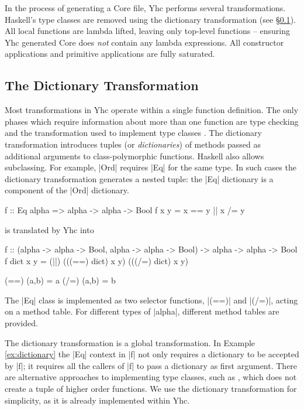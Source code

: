 In the process of generating a Core file, Yhc performs several transformations. Haskell's type classes are removed using the dictionary transformation (see \S\ref{sec:dictionary_transformation}). All local functions are lambda lifted, leaving only top-level functions -- ensuring Yhc generated Core does \textit{not} contain any lambda expressions. All constructor applications and primitive applications are fully saturated.


\subsection{The Dictionary Transformation}
\label{sec:dictionary_transformation}

Most transformations in Yhc operate within a single function definition. The only phases which require information about more than one function are type checking and the transformation used to implement type classes \citep{wadler:type_classes}. The dictionary transformation introduces tuples (or \textit{dictionaries}) of methods passed as additional arguments to class-polymorphic functions. Haskell also allows subclassing. For example, |Ord| requires |Eq| for the same type. In such cases the dictionary transformation generates a nested tuple: the |Eq| dictionary is a component of the |Ord| dictionary.

\begin{example}
\label{ex:dictionary}
\begin{code}
f :: Eq alpha => alpha -> alpha -> Bool
f x y = x == y || x /= y
\end{code}

\noindent is translated by Yhc into

\begin{code}
f :: (alpha -> alpha -> Bool, alpha -> alpha -> Bool) -> alpha -> alpha -> Bool
f dict x y = (||) (((==) dict) x y) (((/=) dict) x y)

(==) (a,b) = a
(/=) (a,b) = b
\end{code}

The |Eq| class is implemented as two selector functions, |(==)| and |(/=)|, acting on a method table. For different types of |alpha|, different method tables are provided.
\end{example}

The dictionary transformation is a global transformation. In Example \ref{ex:dictionary} the |Eq| context in |f| not only requires a dictionary to be accepted by |f|; it requires all the callers of |f| to pass a dictionary as first argument. There are alternative approaches to implementing type classes, such as \citet{jones:dictionary_free}, which does not create a tuple of higher order functions. We use the dictionary transformation for simplicity, as it is already implemented within Yhc.

